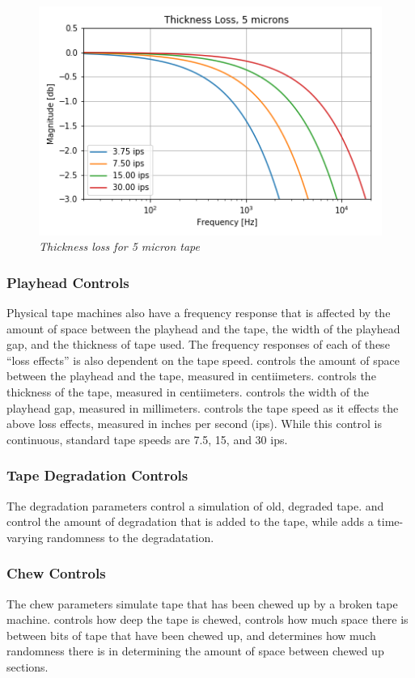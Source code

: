 \documentclass[landscape,twocolumn,a5paper]{manual}
\begin{document}
%
\begin{figure}[ht]
    \center
    \includegraphics[width=0.85\columnwidth]{../Simulations/LossEffects/speed_thickness.png}
    \caption{\label{thick_loss}{\it Thickness loss for 5 micron tape}}
\end{figure}

\subsubsection{Playhead Controls}
Physical tape machines also have a frequency response that
is affected by the amount of space between the playhead and
the tape, the width of the playhead gap, and the thickness
of tape used. The frequency responses of each of these ``loss
effects'' is also dependent on the tape speed.
\newpar
{}
controls the amount of space between the playhead and the tape,
measured in centiimeters.
\newpar
{} controls the thickness
of the tape, measured in centiimeters.
\newpar
{} controls
the width of the playhead gap, measured in millimeters.
\newpar
{}
controls the tape speed as it effects the above loss effects,
measured in inches per second (ips). While this control is
continuous, standard tape speeds are 7.5, 15, and 30 ips.


\subsubsection{Tape Degradation Controls}
The degradation parameters control a simulation of old, degraded
tape.  and  control the amount
of degradation that is added to the tape, while 
adds a time-varying randomness to the degradatation.

\subsubsection{Chew Controls}
The chew parameters simulate tape that has been chewed up by
a broken tape machine.  controls how deep the
tape is chewed,  controls how much space
there is between bits of tape that have been chewed up, and
 determines how much randomness there is
in determining the amount of space between chewed up sections.
\end{document}
